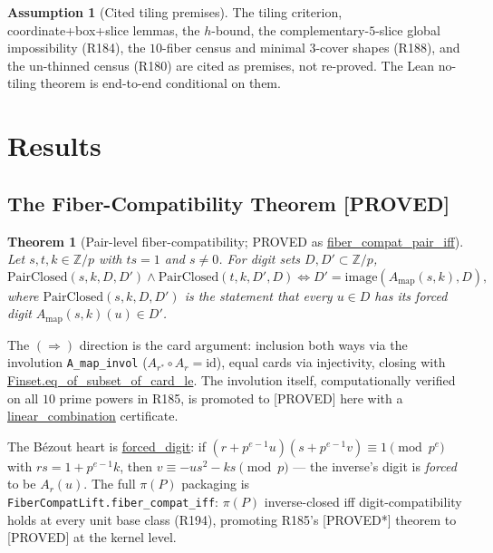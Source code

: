 \documentclass[11pt,a4paper]{article}
\newtheorem{theorem}{Theorem}
\theoremstyle{definition}
\newtheorem{assumption}{Assumption}
\begin{document}
\begin{assumption}[Cited tiling premises]
  \label{asm:premise}
  The tiling criterion, coordinate+box+slice lemmas, the $h$-bound, the
  complementary-$5$-slice global impossibility (R184), the $10$-fiber
  census and minimal $3$-cover shapes (R188), and the un-thinned census
  (R180) are cited as premises, not re-proved. The Lean no-tiling theorem
  is end-to-end conditional on them.
\end{assumption}

\section{Results}

\subsection{The Fiber-Compatibility Theorem [PROVED]}

\begin{theorem}[Pair-level fiber-compatibility; PROVED as
  \url{fiber_compat_pair_iff}]
  \label{thm:pairiff}
  Let $s,t,k\in\mathbb{Z}/p$ with $ts=1$ and $s\ne0$. For digit sets
  $D,D'\subset\mathbb{Z}/p$,
  \[
    \mathrm{PairClosed}(s,k,D,D')\land
    \mathrm{PairClosed}(t,k,D',D)
    \iff D'=\mathrm{image}(A_{\mathrm{map}}(s,k),D),
  \]
  where $\mathrm{PairClosed}(s,k,D,D')$ is the statement that every
  $u\in D$ has its forced digit $A_{\mathrm{map}}(s,k)(u)\in D'$.
\end{theorem}
The $(\Rightarrow)$ direction is the card argument: inclusion both ways
via the involution \texttt{A\_map\_invol} ($A_{r^*}\circ A_r=\mathrm{id}$),
equal cards via injectivity, closing with
\url{Finset.eq_of_subset_of_card_le}. The involution itself,
computationally verified on all $10$ prime powers in R185, is promoted
to [PROVED] here with a \url{linear_combination} certificate.

The B\'ezout heart is \url{forced_digit}: if
$(r+p^{e-1}u)(s+p^{e-1}v)\equiv1\pmod{p^e}$ with $rs=1+p^{e-1}k$, then
$v\equiv -us^2-ks\pmod p$ --- the inverse's digit is \emph{forced} to be
$A_r(u)$. The full $\pi(P)$ packaging is
\texttt{FiberCompatLift.fiber\_compat\_iff}: $\pi(P)$ inverse-closed iff
digit-compatibility holds at every unit base class (R194), promoting
R185's [PROVED*] theorem to [PROVED] at the kernel level.
\end{document}
